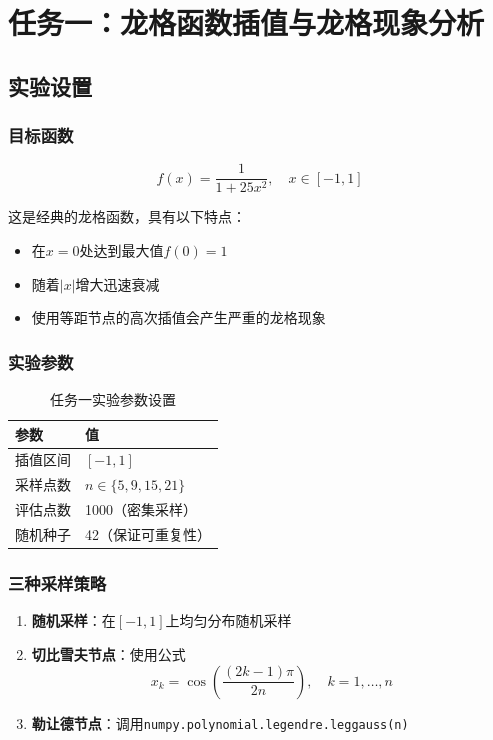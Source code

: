 \documentclass[a4paper,12pt]{article}
\theoremstyle{definition}
\begin{document}
\newpage
\section{任务一：龙格函数插值与龙格现象分析}

\subsection{实验设置}

\subsubsection{目标函数}

\begin{equation}
f(x) = \frac{1}{1 + 25x^2}, \quad x \in [-1, 1]
\end{equation}

这是经典的龙格函数，具有以下特点：
\begin{itemize}
    \item 在$x=0$处达到最大值$f(0) = 1$
    \item 随着$|x|$增大迅速衰减
    \item 使用等距节点的高次插值会产生严重的龙格现象
\end{itemize}

\subsubsection{实验参数}

\begin{table}[h]
\centering
\caption{任务一实验参数设置}
\begin{tabular}{ll}
\toprule
\textbf{参数} & \textbf{值} \\
\midrule
插值区间 & $[-1, 1]$ \\
采样点数 & $n \in \{5, 9, 15, 21\}$ \\
评估点数 & 1000（密集采样） \\
随机种子 & 42（保证可重复性） \\
\bottomrule
\end{tabular}
\end{table}

\subsubsection{三种采样策略}

\begin{enumerate}
    \item \textbf{随机采样}：在$[-1, 1]$上均匀分布随机采样
    \item \textbf{切比雪夫节点}：使用公式
    \begin{equation}
    x_k = \cos\left(\frac{(2k-1)\pi}{2n}\right), \quad k = 1, \ldots, n
    \end{equation}
    \item \textbf{勒让德节点}：调用\texttt{numpy.polynomial.legendre.leggauss(n)}
\end{enumerate}
\end{document}
